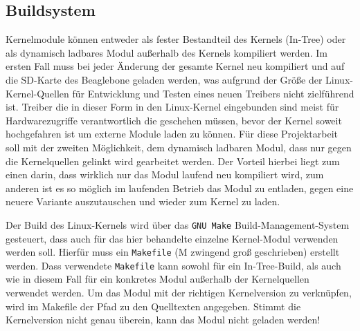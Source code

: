 
\subsection{Buildsystem}
Kernelmodule können entweder als fester Bestandteil des Kernels (In-Tree) oder als dynamisch ladbares Modul außerhalb des Kernels kompiliert werden. Im ersten Fall muss bei jeder Änderung der gesamte Kernel neu kompiliert und auf die SD-Karte des Beaglebone geladen werden, was aufgrund der Größe der Linux-Kernel-Quellen für Entwicklung und Testen eines neuen Treibers nicht zielführend ist. Treiber die in dieser Form in den Linux-Kernel eingebunden sind meist für Hardwarezugriffe verantwortlich die geschehen müssen, bevor der Kernel soweit hochgefahren ist um externe Module laden zu können. %
Für diese Projektarbeit soll mit der zweiten Möglichkeit, dem dynamisch ladbaren Modul, dass nur gegen die Kernelquellen gelinkt wird gearbeitet werden. Der Vorteil hierbei liegt zum einen darin, dass wirklich nur das Modul laufend neu kompiliert wird, zum anderen ist es so möglich im laufenden Betrieb das Modul zu entladen, gegen eine neuere Variante auszutauschen und wieder zum Kernel zu laden. 

Der Build des Linux-Kernels wird über das \texttt{GNU Make} Build-Management-System gesteuert, dass auch für das hier behandelte einzelne Kernel-Modul verwenden werden soll. Hierfür muss ein \texttt{Makefile} (M zwingend groß geschrieben) erstellt werden. Dass verwendete \texttt{Makefile} kann sowohl für ein In-Tree-Build, als auch wie in diesem Fall für ein konkretes Modul außerhalb der Kernelquellen verwendet werden. Um das Modul mit der richtigen Kernelversion zu verknüpfen, wird im Makefile der Pfad zu den Quelltexten angegeben. Stimmt die Kernelversion nicht genau überein, kann das Modul nicht geladen werden! 

